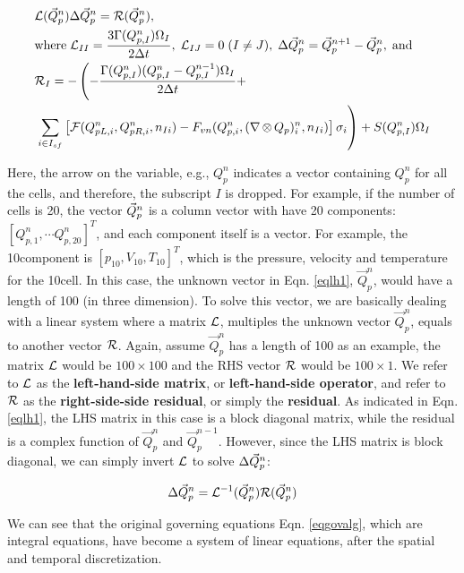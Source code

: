 \documentclass[12pt, letterpaper]{report}
\begin{document}
\begin{align}\label{eqlh1}
   \begin{split}
      & \mathcal{L}(\vec{Q}_p^n) \Delta \vec{Q}_p^n = \mathcal{R}(\vec{Q}_p^n), \\ & \textrm{where} \; \mathcal{L}_{II} =
      \frac{3\Gamma(Q_{p,I}^n)\Omega_I}{2\Delta t}, \; \mathcal{L}_{IJ} = 0 \; (I \neq J), \; \Delta \vec{Q}_p^n =
      \vec{Q}_p^{n+1} - \vec{Q}_p^n, \; \textrm{and } \\
      & \mathcal{R}_I = -\left(-\frac{\Gamma(Q_{p,I}^n) (Q_{p,I}^n - Q_{p,I}^{n-1})\Omega_I}{2\Delta t} +
         \right.\\
      &\left.\sum_{i \in
            I_{sf}}\left[\mathcal{F}(Q_{pL,i}^n, Q_{pR,i}^n, n_{Ii}) - F_{vn}(Q_{p,i}^n, (\nabla
\mathop{\otimes} Q_p)_i^n, n_{Ii})\right]\sigma_i\right) + S(Q_{p,I}^n)\Omega_I
   \end{split}
\end{align}

Here, the arrow on the variable, e.g., $Q_p^n$ indicates a vector containing $Q_p^n$ for all the
cells, and therefore, the subscript $I$ is dropped. For example, if the number of cells is 20, the
vector $\vec{Q}_p^n$ is a column vector with have 20 components: $[Q_{p,1}^n, \cdots Q_{p,20}^n]^T$, and
each component itself is a vector. For example, the 10\th component is $[p_{10}, V_{10}, T_{10}]^T$,
which is the pressure, velocity and temperature for the 10\th cell. In this case, the unknown vector
in Eqn.  \ref{eqlh1}, $\vec{Q}_p^n$, would have a length of 100 (in three dimension). To solve this
vector, we are basically dealing with a linear system where a matrix $\mathcal{L}$, multiples the unknown
vector $\vec{Q}_p^n$, equals to another vector $\mathcal{R}$. Again, assume $\vec{Q}_p^n$ has a length of 100
as an example, the matrix $\mathcal{L}$ would be $100 \times 100$ and the RHS vector $\mathcal{R}$ would be $100
\times 1$. We refer to $\mathcal{L}$ as the {\bf left-hand-side matrix}, or {\bf left-hand-side operator},
and refer to $\mathcal{R}$ as the {\bf right-side-side residual}, or simply the {\bf residual}. As indicated
in Eqn. \ref{eqlh1}, the LHS matrix in this case is a block diagonal matrix, while the residual is
a complex function of $\vec{Q}_p^n$ and $\vec{Q}_p^{n-1}$. However, since the LHS matrix is block
diagonal, we can simply invert $\mathcal{L}$ to solve $\Delta \vec{Q}_p^n$:

\begin{align*}
   \Delta \vec{Q}_p^n = \mathcal{L}^{-1}(\vec{Q}_p^n) \mathcal{R}(\vec{Q}_p^n)
\end{align*}

We can see that the original governing equations Eqn. \ref{eqgovalg}, which are integral equations, have
become a system of linear equations, after the spatial and temporal discretization. \paraspace
\end{document}
